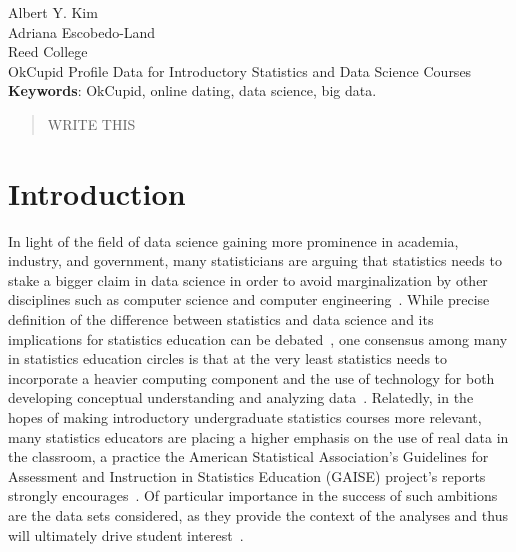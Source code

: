 \documentclass{article}\usepackage[]{graphicx}\usepackage[]{color}
\makeatletter
\newenvironment{kframe}{%
 \def\at@end@of@kframe{}%
 \ifinner\ifhmode%
  \def\at@end@of@kframe{\end{minipage}}%
  \begin{minipage}{\columnwidth}%
 \fi\fi%
 \def\FrameCommand##1{\hskip\@totalleftmargin \hskip-\fboxsep
 \colorbox{shadecolor}{##1}\hskip-\fboxsep
     \hskip-\linewidth \hskip-\@totalleftmargin \hskip\columnwidth}%
 \MakeFramed {\advance\hsize-\width
   \@totalleftmargin\z@ \linewidth\hsize
   \@setminipage}}%
 {\par\unskip\endMakeFramed%
 \at@end@of@kframe}
\newenvironment{knitrout}{}{} %
\makeatother
\begin{document}
\begin{knitrout}
\color{fgcolor}\begin{kframe}


{\ttfamily\noindent\color{warningcolor}{\#\# Warning: package 'car' was built under R version 3.1.3}}

{\ttfamily\noindent\color{warningcolor}{\#\# Warning: package 'lattice' was built under R version 3.1.3}}

{\ttfamily\noindent\color{warningcolor}{\#\# Warning: package 'ggplot2' was built under R version 3.1.3}}\end{kframe}
\end{knitrout}


\noindent Albert Y. Kim\\
Adriana Escobedo-Land\\
Reed College\\
OkCupid Profile Data for Introductory Statistics and Data Science Courses\\

\noindent \textbf{Keywords}: OkCupid, online dating, data science, big data.

\begin{abstract}

WRITE THIS

\end{abstract}










%
\section{Introduction}\label{intro}
%
In light of the field of data science gaining more prominence in academia, industry, and government, many statisticians are arguing that statistics needs to stake a bigger claim in data science in order to avoid marginalization by other disciplines such as computer science and computer engineering~\cite{YU:2014,DAVIDSON:2014}.  While precise definition of the difference between statistics and data science and its implications for statistics education can be debated~\cite{WICKHAM:2014}, one consensus among many in statistics education circles is that at the very least statistics needs to incorporate a heavier computing component and the use of technology for both developing conceptual understanding and analyzing data~\cite{GAISE:05, NOLAN:LANG:2010}.  Relatedly, in the hopes of making introductory undergraduate statistics courses more relevant, many statistics educators are placing a higher emphasis on the use of real data in the classroom, a practice the American Statistical Association's Guidelines for Assessment and Instruction in Statistics Education (GAISE) project's reports strongly encourages~\cite{GAISE:05}.  Of particular importance in the success of such ambitions are the data sets considered, as they provide the context of the analyses and thus will ultimately drive student interest~\cite{GOULD:2010}.
\end{document}
